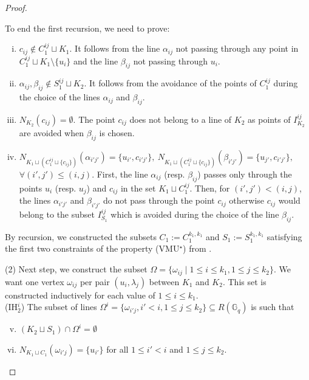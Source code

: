 \documentclass[a4paper,UKenglish,cleveref, autoref, thm-restate]{arxiv}
\newcommand{\ls}{\leqslant}
\newcommand{\G}[1][q]{\mathbb{G}_{#1}}
\begin{document}
\begin{proof}
\begin{itemize}
        \end{itemize}
        To end the first recursion, we need to prove:
        \begin{enumerate}[(i)]
            \item $c_{ij} \notin C_1^{ij} \sqcup K_1$. It follows from the line $\alpha_{ij}$ not passing through any point in $C_1^{ij} \sqcup K_1 \setminus \{u_i\}$ and the line $\beta_{ij}$ not passing through $u_i$. 
            \item $\alpha_{ij},\beta_{ij} \notin S_1^{ij} \sqcup K_2$. It follows from the avoidance of the points of $C_1^{ij}$ during the choice of the lines $\alpha_{ij}$ and $\beta_{ij}$.
            \item $N_{K_2}(c_{ij}) = \emptyset $. The point $c_{ij}$ does not belong to a line of $K_2$ as points of $I_{K_2}^{ij}$ are avoided when $\beta_{ij}$ is chosen.
            \item  $N_{K_1 \sqcup (C_1^{ij}\sqcup \{c_{ij}\})}(\alpha_{i'j'}) = \{u_{i'}, c_{i'j'}\},\ N_{K_1 \sqcup (C_1^{ij}\sqcup \{c_{ij}\})}(\beta_{i'j'}) = \{u_{j'}, c_{i'j'}\},$ \\$\forall (i', j')\ls(i,j)$. First, the line $\alpha_{ij}$ (resp. $\beta_{ij}$) passes only through the points $u_i$ (resp. $u_j$) and $c_{ij}$ in  the set $K_1 \sqcup C_1^{ij}$. Then,  for $(i', j') < (i,j)$, the lines $\alpha_{i'j'}$ and $\beta_{i'j'}$ do not pass through the point $c_{ij}$ otherwise $c_{ij}$ would belong to the subset $I_{S_1}^{ij}$ which is avoided during the choice of the line $\beta_{ij}$. 
        \end{enumerate}
        By recursion, we constructed the subsets $C_1 := C_1^{k_1, k_1}$ and $S_1 := S_1^{k_1, k_1}$ satisfying the first two constraints of the property (VMU$^\star$) from .
        
        \bigskip (2) Next step, we construct the subset $\Omega = \{\omega_{ij}\mid 1 \ls i \ls k_1, 1 \ls j \ls k_2\}$. We want one vertex $\omega_{ij}$ per pair $(u_i, \lambda_j)$ between $K_1$ and $K_2$. This set is constructed inductively for each value of $1 \ls i \ls k_1$. \\

        (IH$_2^{i}$) The subset of lines $\Omega^i = \{\omega_{i'j}, i' < i, 1 \ls j \ls k_2\} \subseteq R(\G)$ is such that         
        \begin{enumerate}[(i)]
            \setcounter{enumi}{4}
            \item $ (K_2 \sqcup S_1)\cap \Omega^i= \emptyset$
            \item $N_{K_1 \sqcup C_1}(\omega_{i'j}) = \{u_{i'}\}$ for all $1 \ls i' < i$ and $1 \ls j \ls k_2$.
        \end{enumerate}
        

\end{proof}
\end{document}
